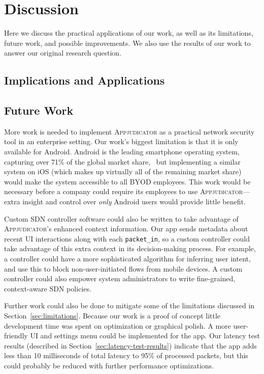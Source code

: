 \section{Discussion}
\label{sec:discussion}

Here we discuss the practical applications of our work, as well as its
limitations, future work, and possible improvements. We also use the results of
our work to answer our original research question.

\subsection{Implications and Applications}
\label{sec:implications-and-applications}

\subsection{Future Work}
\label{sec:future-work}

More work is needed to implement \textsc{Appjudicator} as a practical network
security tool in an enterprise setting. Our work's biggest limitation is that it
is only available for Android. Android is the leading smartphone operating
system, capturing over 71\% of the global market share,~\cite{statcounter2021}
but implementing a similar system on iOS (which makes up virtually all of the
remaining market share) would make the system accessible to all BYOD employees.
This work would be necessary before a company could require its employees to use
\textsc{Appjudicator}---extra insight and control over \textit{only} Android
users would provide little benefit.

Custom SDN controller software could also be written to take advantage of
\textsc{Appjudicator}'s enhanced context information. Our app sends metadata
about recent UI interactions along with each \texttt{packet\_in}, so a custom
controller could take advantage of this extra context in its decision-making
process. For example, a controller could have a more sophisticated algorithm for
inferring user intent, and use this to block non-user-initiated flows from
mobile devices. A custom controller could also empower system administrators to
write fine-grained, context-aware SDN policies. 

Further work could also be done to mitigate some of the limitations discussed in
Section~\ref{sec:limitations}. Because our work is a proof of concept little
development time was spent on optimization or graphical polish. A more
user-friendly UI and settings menu could be implemented for the app. Our latency
test results (described in Section~\ref{sec:latency-test-results}) indicate that
the app adds less than 10 milliseconds of total latency to 95\% of processed
packets, but this could probably be reduced with further performance
optimizations.

